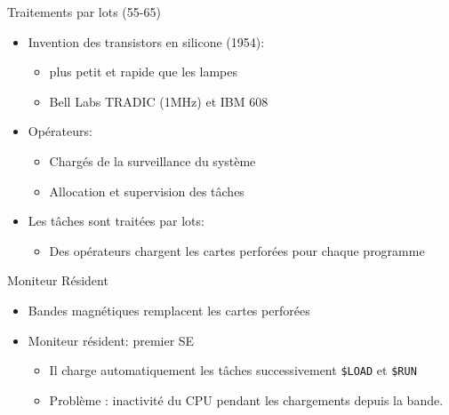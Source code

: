 \documentclass[11pt]{beamer}
\begin{document}
\begin{frame}{Traitements par lots (55-65)}
\begin{itemize}
\item
  Invention des transistors en silicone (1954):

  \begin{itemize}
  \item
    plus petit et rapide que les lampes
  \item
    Bell Labs TRADIC (1MHz) et IBM 608
  \end{itemize}
\item
  Opérateurs:

  \begin{itemize}
  \itemsep1pt\parskip0pt
  \item
    Chargés de la surveillance du système
  \item
    Allocation et supervision des tâches
  \end{itemize}
\item
  Les tâches sont traitées par lots:
  \begin{itemize}
      \item Des opérateurs chargent les cartes perforées pour chaque programme
  \end{itemize}
\end{itemize}
\end{frame}


\begin{frame}{Moniteur Résident}
  \begin{itemize}
  \itemsep1pt\parskip0pt
  \item
    Bandes magnétiques remplacent les cartes perforées
  \item
    Moniteur résident: premier SE

    \begin{itemize}
    \itemsep1pt\parskip0pt
    \item
      Il charge automatiquement les tâches successivement
      \texttt{\$LOAD} et \texttt{\$RUN}
    \item Problème : inactivité du CPU pendant les chargements depuis la bande.
    \end{itemize}
  \end{itemize}
\end{frame}
\end{document}
